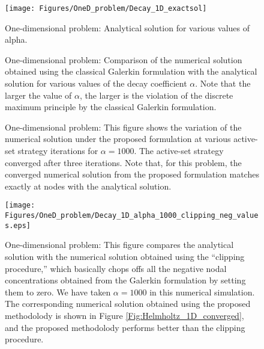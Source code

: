 \documentclass[11pt]{amsart}
\begin{document}
\begin{figure}[htp]
  \centering
  \texttt{[image: Figures/OneD\_problem/Decay\_1D\_exactsol]}
  \caption{One-dimensional problem: Analytical solution for various 
  values of alpha.} \label{Fig:TransientDMP_1D_exactsol}
\end{figure}

\begin{figure}[!h]
  \centering
  \caption{One-dimensional problem: Comparison of the numerical solution obtained 
  using the classical Galerkin formulation with the analytical solution for various 
  values of the decay coefficient $\alpha$. Note that the larger the value of $\alpha$, 
  the larger is the violation of the discrete maximum principle by the classical 
  Galerkin formulation.} 
  \label{Fig:Decay_1D_various_alpha}
\end{figure}

\begin{figure}[!h]
  \centering
  \caption{One-dimensional problem: This figure shows the variation of the numerical 
    solution under the proposed formulation at various active-set strategy iterations 
    for $\alpha = 1000$. The active-set strategy converged after three iterations. Note 
    that, for this problem, the converged numerical solution from the proposed formulation 
    matches exactly at nodes with the analytical solution.} 
    \label{fig:Helmholtz_1D_NonNeg_iters}
\end{figure}

\begin{figure}
  \texttt{[image: Figures/OneD\_problem/Decay\_1D\_alpha\_1000\_clipping\_neg\_values.eps]}
  \caption{One-dimensional problem: This figure compares the analytical solution 
    with the numerical solution obtained using the ``clipping procedure,'' which 
    basically chops offs all the negative nodal concentrations obtained from the 
    Galerkin formulation by setting them to zero. We have taken $\alpha = 1000$ 
    in this numerical simulation. The corresponding numerical solution obtained 
    using the proposed methodolody is shown in Figure \ref{Fig:Helmholtz_1D_converged}, 
    and the proposed methodolody performs better than the clipping procedure.} 
  \label{Fig:Helmholtz_1D_clipping}
\end{figure}
\end{document}
